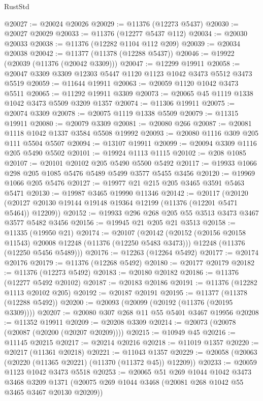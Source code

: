 \begin{lexlean}{RustStd}
\begin{coremodule}
{\begin{coremodule}
{{{{{{{{{{{{{{{{{{{{{{{{{{{{{{{{{{{{{{{{{{{{{{{{{{{{{{{{{{{{{{{{{{{{{{{{{{{{{{{{{{{{{@20027 := @20024 @20026
@20029 := @11376 (@12273 @5437)
@20030 := @20027 @20029
@20033 := @11376 (@12277 @5437 @112)
@20034 := @20030 @20033
@20038 := @11376 (@12282 @1104 @112 @209)
@20039 := @20034 @20038
@20042 := @11377 (@11378 (@12288 @5437))
@20046 := @19922 (@20039 (@11376 (@20042 @3309)))
@20047 := @12299 @19911
@20058 := @20047 @3309 @3309 @12303 @5447 @1120 @1123 @1042 @3473 @5512 @3473 @5519
@20059 := @11644 @19911
@20063 := @20059 @1120 @1042 @3473 @5511
@20065 := @11292 @19911 @3309
@20073 := @20065 @45 @1119 @1338 @1042 @3473 @5509 @3209 @1357
@20074 := @11306 @19911
@20075 := @20074 @3309
@20078 := @20075 @1119 @1338 @5509
@20079 := @11315 @19911
@20080 := @20079 @3309
@20081 := @20080 @266
@20087 := @20081 @1118 @1042 @1337 @3584 @5508 @19992
@20093 := @20080 @1116 @309 @205 @111 @5504 @5507
@20094 := @13107 @19911
@20099 := @20094 @3309 @1116 @205 @5490 @5502
@20101 := @19924 @1113 @1115
@20102 := @208 @1085
@20107 := @20101 @20102 @205 @5490 @5500 @5492
@20117 := @19933 @1066 @298 @205 @1085 @5476 @5489 @5499 @3577 @5455 @3456
@20120 := @19969 @1066 @205 @5476
@20127 := @19977 @21 @215 @205 @3465 @3591 @5463 @5471
@20130 := @19987 @3465 @19990 @11346
@20142 := @20117
    (@20120 (@20127 @20130 @19144 @19148 @19364 @12199 (@11376 (@12201 @5471 @5464)) @12209))
@20152 := @19933 @296 @268 @205 @55 @3513 @3473 @3467 @3577 @5482 @3456
@20156 := @19945 @21 @205 @21 @3513
@20158 := @11335 (@19950 @21)
@20174 := @20107
    (@20142
      (@20152 (@20156 @20158 @11543) @20008 @12248 (@11376 (@12250 @5483 @3473)))
      @12248
      (@11376 (@12250 @5456 @5489)))
@20176 := @12263 (@12264 @5492)
@20177 := @20174 @20176
@20179 := @11376 (@12268 @5492)
@20180 := @20177 @20179
@20182 := @11376 (@12273 @5492)
@20183 := @20180 @20182
@20186 := @11376 (@12277 @5492 @20102)
@20187 := @20183 @20186
@20191 := @11376 (@12282 @1113 @20102 @205)
@20192 := @20187 @20191
@20195 := @11377 (@11378 (@12288 @5492))
@20200 := @20093 (@20099 (@20192 (@11376 (@20195 @3309))))
@20207 := @20080 @307 @268 @11 @55 @5401 @3467 @19956
@20208 := @11352 @19911
@20209 := @20208 @3309
@20214 := @20073 (@20078 (@20087 (@20200 (@20207 @20209))))
@20215 := @10949 @45
@20216 := @11145 @20215
@20217 := @20214 @20216
@20218 := @11019 @1357
@20220 := @20217 (@11361 @20218)
@20221 := @11043 @1357
@20229 := @20058 (@20063 (@20220 (@11365 @20221) (@11370 (@11372 @45)) @12209))
@20233 := @20059 @1123 @1042 @3473 @5518
@20253 := @20065
    @51
    @269
    @1044
    @1042
    @3473
    @3468
    @3209
    @1371
    (@20075 @269 @1044 @3468 (@20081 @268 @1042 @55 @3465 @3467 @20130 @20209))
}}}}}}}}}}}}}}}}}}}}}}}}}}}}}}}}}}}}}}}}}}}}}}}}}}}}}}}}}}}}}}}}}}}}}}}}}}}}}}}}}}}}}
\end{coremodule}}
\end{coremodule}
\end{lexlean}
